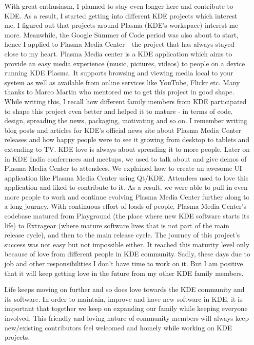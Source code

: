 With great enthusiasm, I planned to stay even longer here and contribute to KDE. As a result, I started getting into different KDE projects which interest me. I figured out that projects around Plasma (KDE’s workspace) interest me more. Meanwhile, the Google Summer of Code period was also about to start, hence I applied to Plasma Media Center - the project that has always stayed close to my heart. Plasma Media center is a KDE application which aims to provide an easy media experience (music, pictures, videos) to people on a device running KDE Plasma. It supports browsing and viewing media local to your system as well as available from online services like YouTube, Flickr etc. Many thanks to Marco Martin who mentored me to get this project in good shape. While writing this, I recall how different family members from KDE participated to shape this project even better and helped it to mature - in terms of code, design, spreading the news, packaging, motivating and so on. I remember writing blog posts and articles for KDE's official news site about Plasma Media Center releases and how happy people were to see it growing from desktop to tablets and extending to TV. KDE love is always about spreading it to more people. Later on in KDE India conferences and meetups, we used to talk about and give demos of Plasma Media Center to attendees. We explained how to create an awesome UI application like Plasma Media Center using Qt/KDE. Attendees used to love this application and liked to contribute to it. As a result, we were able to pull in even more people to work and continue evolving Plasma Media Center further along to a long journey. With continuous effort of loads of people, Plasma Media Center's codebase matured from Playground (the place where new KDE software starts its life) to Extragear (where mature software lives that is not part of the main release cycle), and then to the main release cycle. The journey of this project's success was not easy but not impossible either. It reached this maturity level only because of love from different people in KDE community. Sadly, these days due to job and other responsibilities I don't have time to work on it. But I am positive that it will keep getting love in the future from my other KDE family members.

Life keeps moving on further and so does love towards the KDE community and its software. In order to maintain, improve and have new software in KDE, it is important that together we keep on expanding our family while keeping everyone involved. This friendly and loving nature of community members will always keep new/existing contributors feel welcomed and homely while working on KDE projects.
